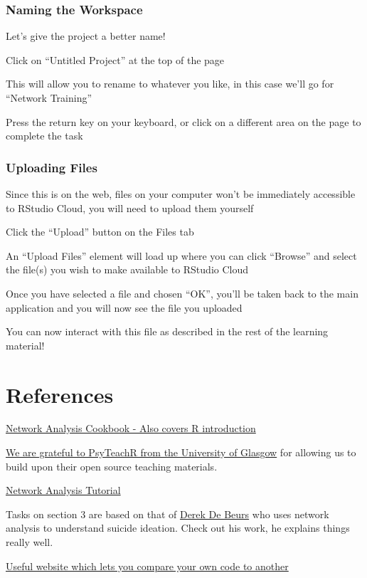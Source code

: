 \documentclass[]{book}
\begin{document}
\hypertarget{naming-the-workspace}{%
\subsection{Naming the Workspace}\label{naming-the-workspace}}

Let's give the project a better name!

Click on ``Untitled Project'' at the top of the page

This will allow you to rename to whatever you like, in this case we'll go for ``Network Training''

Press the return key on your keyboard, or click on a different area on the page to complete the task

\hypertarget{uploading-files}{%
\subsection{Uploading Files}\label{uploading-files}}

Since this is on the web, files on your computer won't be immediately accessible to RStudio Cloud, you will need to upload them yourself

Click the ``Upload'' button on the Files tab

An ``Upload Files'' element will load up where you can click ``Browse'' and select the file(s) you wish to make available to RStudio Cloud

Once you have selected a file and chosen ``OK'', you'll be taken back to the main application and you will now see the file you uploaded

You can now interact with this file as described in the rest of the learning material!

\hypertarget{references}{%
\chapter{References}\label{references}}

\href{http://sachaepskamp.com/files/Cookbook.html}{Network Analysis Cookbook - Also covers R introduction}

\href{https://psyteachr.github.io/}{We are grateful to PsyTeachR from the University of Glasgow} for allowing us to build upon their open source teaching materials.

\href{https://www.tandfonline.com/doi/full/10.1080/21642850.2018.1521283}{Network Analysis Tutorial}

Tasks on section 3 are based on that of \href{http://www.derekdebeurs.com/about}{Derek De Beurs} who uses network analysis to understand suicide ideation. Check out his work, he explains things really well.

\href{\%22https://text-compare.com/\%22}{Useful website which lets you compare your own code to another}


\end{document}
